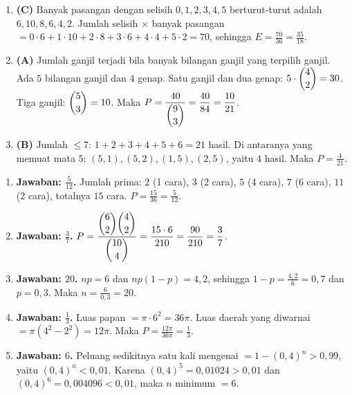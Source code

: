 \documentclass[a4paper,11pt]{article}
\newcommand{\dis}{\displaystyle}
\newcounter{no}
\begin{document}
\begin{enumerate}[leftmargin=2em,itemsep=2pt,topsep=2pt]
\item[\textbf{13.}] \textbf{(C)} Banyak pasangan dengan selisih $0,1,2,3,4,5$ berturut-turut adalah $6,10,8,6,4,2$. Jumlah selisih $\times$ banyak pasangan $=0\cdot6+1\cdot10+2\cdot8+3\cdot6+4\cdot4+5\cdot2=70$, sehingga $E=\dis\frac{70}{36}=\dis\frac{35}{18}$.
\item[\textbf{14.}] \textbf{(A)} Jumlah ganjil terjadi bila banyak bilangan ganjil yang terpilih ganjil. Ada $5$ bilangan ganjil dan $4$ genap. Satu ganjil dan dua genap: $5\cdot\dbinom42=30$. Tiga ganjil: $\dbinom53=10$. Maka $P=\dis\frac{40}{\dbinom93}=\dis\frac{40}{84}=\dis\frac{10}{21}$.
\item[\textbf{15.}] \textbf{(B)} Jumlah $\le7$: $1+2+3+4+5+6=21$ hasil. Di antaranya yang memuat mata $5$: $(5,1),(5,2),(1,5),(2,5)$, yaitu $4$ hasil. Maka $P=\dis\frac4{21}$.
\end{enumerate}
\par{}\par\vspace{0.2em}
\small\begin{enumerate}[leftmargin=2em,itemsep=2pt,topsep=2pt]
\item[\textbf{1.}] \textbf{Jawaban: $\dis\frac5{12}$.} Jumlah prima: $2$ (1 cara), $3$ (2 cara), $5$ (4 cara), $7$ (6 cara), $11$ (2 cara), totalnya $15$ cara. $P=\dis\frac{15}{36}=\dis\frac5{12}$.
\item[\textbf{2.}] \textbf{Jawaban: $\dis\frac37$.} $P=\dis\frac{\dbinom62\dbinom42}{\dbinom{10}4}=\dis\frac{15\cdot6}{210}=\dis\frac{90}{210}=\dis\frac37$.
\item[\textbf{3.}] \textbf{Jawaban: $20$.} $np=6$ dan $np(1-p)=4{,}2$, sehingga $1-p=\dis\frac{4{,}2}{6}=0{,}7$ dan $p=0{,}3$. Maka $n=\dis\frac{6}{0{,}3}=20$.
\item[\textbf{4.}] \textbf{Jawaban: $\dis\frac13$.} Luas papan $=\pi\cdot6^{2}=36\pi$. Luas daerah yang diwarnai $=\pi(4^{2}-2^{2})=12\pi$. Maka $P=\dis\frac{12\pi}{36\pi}=\dis\frac13$.
\item[\textbf{5.}] \textbf{Jawaban: $6$.} Peluang sedikitnya satu kali mengenai $=1-(0{,}4)^{n}>0{,}99$, yaitu $(0{,}4)^{n}<0{,}01$. Karena $(0{,}4)^{5}=0{,}01024>0{,}01$ dan $(0{,}4)^{6}=0{,}004096<0{,}01$, maka $n$ minimum $=6$.
\end{enumerate}
\par{}\par\vspace{0.2em}
\end{document}
